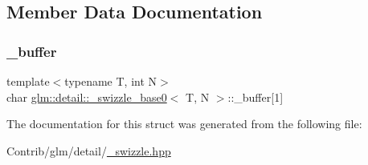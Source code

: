 \subsection{Member Data Documentation}
\mbox{\label{structglm_1_1detail_1_1__swizzle__base0_afd4b7f15c9acff4cdef808f559ffec2d}} 
\subsubsection{\texorpdfstring{\+\_\+buffer}{\_buffer}}
{\footnotesize\ttfamily template$<$typename T, int N$>$ \\
char \mbox{\hyperlink{structglm_1_1detail_1_1__swizzle__base0}{glm\+::detail\+::\+\_\+swizzle\+\_\+base0}}$<$ T, N $>$\+::\+\_\+buffer\mbox{[}1\mbox{]}\hspace{0.3cm}{\ttfamily [protected]}}



The documentation for this struct was generated from the following file\+:\begin{DoxyCompactItemize}
\item 
Contrib/glm/detail/\mbox{\hyperlink{__swizzle_8hpp}{\+\_\+swizzle.\+hpp}}\end{DoxyCompactItemize}
